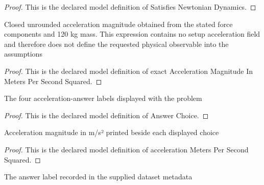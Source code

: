 \begin{proof}
  This is the declared model definition of Satisfies Newtonian Dynamics.
\end{proof}
\begin{definition}
  \label{def:physics:phyx-mini-0755:phyxminiproblems-problemphyxmini0755-exactaccelerationmagnitudeinmeterspersecondsquared}
  Closed unrounded acceleration magnitude obtained from the stated force components and 120 kg mass. This expression contains no setup acceleration field and therefore does not define the requested physical observable into the assumptions
\end{definition}
\begin{proof}
  This is the declared model definition of exact Acceleration Magnitude In Meters Per Second Squared.
\end{proof}
\begin{definition}
  \label{def:physics:phyx-mini-0755:phyxminiproblems-problemphyxmini0755-answerchoice}
  The four acceleration-answer labels displayed with the problem
\end{definition}
\begin{proof}
  This is the declared model definition of Answer Choice.
\end{proof}
\begin{definition}
  \label{def:physics:phyx-mini-0755:phyxminiproblems-problemphyxmini0755-answerchoice-accelerationmeterspersecondsquared}
  Acceleration magnitude in m/s² printed beside each displayed choice
\end{definition}
\begin{proof}
  This is the declared model definition of acceleration Meters Per Second Squared.
\end{proof}
\begin{definition}
  \label{def:physics:phyx-mini-0755:phyxminiproblems-problemphyxmini0755-recordedanswerchoice}
  The answer label recorded in the supplied dataset metadata
\end{definition}
